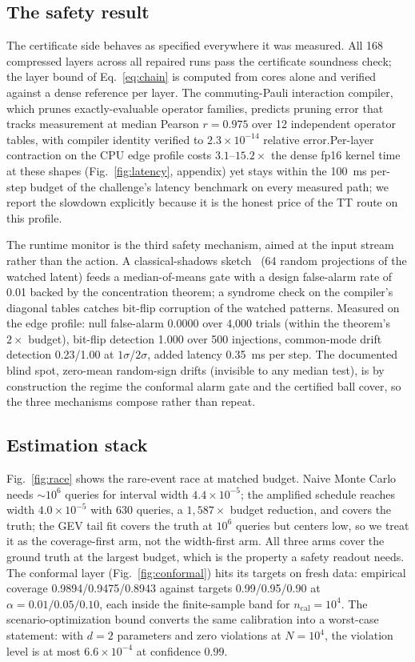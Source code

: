 \documentclass[conference,10pt]{IEEEtran}
\begin{document}
\subsection{The safety result}
The certificate side behaves as specified everywhere it was measured. All
168 compressed layers across all repaired runs pass the certificate
soundness check; the layer bound of Eq.~\eqref{eq:chain} is computed from
cores alone and verified against a dense reference per layer. The
commuting-Pauli interaction compiler, which prunes exactly-evaluable operator
families, predicts pruning error that tracks measurement at median Pearson
$r = 0.975$ over 12 independent operator tables, with compiler identity
verified to $2.3\times10^{-14}$ relative error.Per-layer contraction on the CPU edge profile costs $3.1$--$15.2\times$ the dense fp16 kernel time at
these shapes (Fig.~\ref{fig:latency}, appendix) yet stays within the 100~ms
per-step budget of the challenge's latency benchmark on every measured path;
we report the slowdown explicitly because it is the honest price of the TT
route on this profile.

The runtime monitor is the third safety mechanism, aimed at the input stream
rather than the action. A classical-shadows sketch~\cite{huang20} (64 random projections of
the watched latent) feeds a median-of-means gate with a design false-alarm
rate of 0.01 backed by the concentration theorem; a syndrome check on the
compiler's diagonal tables catches bit-flip corruption of the watched
patterns. Measured on the edge profile: null false-alarm 0.0000 over
4{,}000 trials (within the theorem's $2\times$ budget), bit-flip detection
1.000 over 500 injections, common-mode drift detection 0.23/1.00 at
$1\sigma$/$2\sigma$, added latency 0.35~ms per step. The documented blind
spot, zero-mean random-sign drifts (invisible to any median test), is
by construction the regime the conformal alarm gate and the certified ball
cover, so the three mechanisms compose rather than repeat.

\subsection{Estimation stack}
Fig.~\ref{fig:race} shows the rare-event race at matched budget. Naive Monte
Carlo needs $\sim10^{6}$ queries for interval width $4.4\times10^{-5}$; the
amplified schedule reaches width $4.0\times10^{-5}$ with 630 queries,
a $1{,}587\times$ budget reduction, and covers the truth; the GEV tail fit
covers the truth at $10^{6}$ queries but centers low, so we treat it as the
coverage-first arm, not the width-first arm. All three arms cover the ground
truth at the largest budget, which is the property a safety readout needs.
The conformal layer (Fig.~\ref{fig:conformal}) hits its targets on fresh
data: empirical coverage 0.9894/0.9475/0.8943 against targets
0.99/0.95/0.90 at $\alpha = 0.01/0.05/0.10$, each inside the finite-sample
band for $n_{\mathrm{cal}} = 10^{4}$. The scenario-optimization bound
converts the same calibration into a worst-case statement: with $d=2$
parameters and zero violations at $N=10^{4}$, the violation level is at most
$6.6\times10^{-4}$ at confidence $0.99$.
\end{document}
